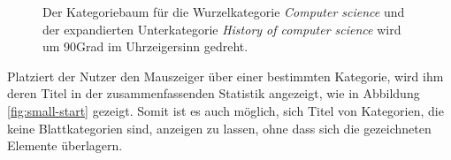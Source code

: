 \begin{figure}
    \caption{Der Kategoriebaum für die Wurzelkategorie \emph{Computer science} und der expandierten Unterkategorie \emph{History of computer science} wird um 90\textdegree Grad im Uhrzeigersinn gedreht.}
    \label{fig:rotation-tree}
\end{figure}

Platziert der Nutzer den Mauszeiger über einer bestimmten Kategorie, wird ihm deren Titel in der zusammenfassenden Statistik angezeigt, wie in Abbildung \ref{fig:small-start} gezeigt.
Somit ist es auch möglich, sich Titel von Kategorien, die keine Blattkategorien sind, anzeigen zu lassen, ohne dass sich die gezeichneten Elemente überlagern.


